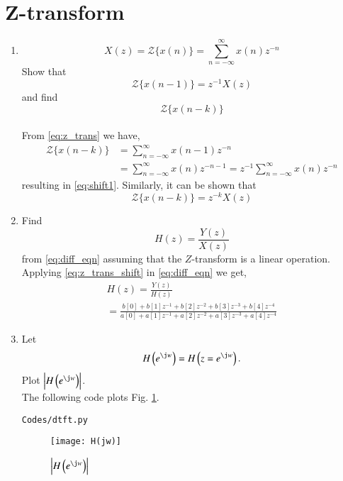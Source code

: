 \documentclass[journal,12pt,twocolumn]{IEEEtran}
\renewcommand\thesection{\arabic{section}}
\begin{document}
\section{Z-transform}
\begin{enumerate}[label=\thesection.\arabic*,ref=\thesection.\theenumi]
\item
\label{prob:Z-transform_formula}
%
\begin{equation}
\label{eq:z_trans}
X(z)={\mathcal {Z}}\{x(n)\}=\sum _{n=-\infty }^{\infty }x(n)z^{-n}
\end{equation}
%
Show that
\begin{equation}
\label{eq:shift1}
{\mathcal {Z}}\{x(n-1)\} = z^{-1}X(z)
\end{equation}
and find
\begin{equation}
    {\mathcal {Z}}\{x(n-k)\} 
\end{equation}
\\
\solution From \eqref{eq:z_trans} we have,
\begin{align}
{\mathcal {Z}}\{x(n-k)\} &=\sum _{n=-\infty }^{\infty }x(n-1)z^{-n}
\\
&=\sum _{n=-\infty }^{\infty }x(n)z^{-n-1} = z^{-1}\sum _{n=-\infty }^{\infty }x(n)z^{-n}
\end{align}
resulting in \eqref{eq:shift1}. Similarly, it can be shown that
%
\begin{equation}
\label{eq:z_trans_shift}
    {\mathcal {Z}}\{x(n-k)\} = z^{-k}X(z)
\end{equation}
\item Find
%
\begin{equation}
H(z) = \frac{Y(z)}{X(z)}
\end{equation}
%
from  \eqref{eq:diff_eqn} assuming that the $Z$-transform is a linear operation.
\\
\solution  Applying \eqref{eq:z_trans_shift} in \eqref{eq:diff_eqn} we get,
\begin{equation}
\begin{split}
H(z) = \frac{Y(z)}{H(z)}                
\\
=\frac{b[0]+b[1]z^{-1}+b[2]z^{-2}+b[3]z^{-3}+b[4]z^{-4}}{a[0]+a[1]z^{-1}+a[2]z^{-2}+a[3]z^{-3}+a[4]z^{-4}}
\label{eq:freq_resp}
\end{split}
\end{equation}
%
\item 
Let
\begin{equation}
H\brak{e^{\j w}} = H\brak{z = e^{\j w}}.
\end{equation}
Plot $\abs{H\brak{e^{\j w}}}$.
\\
\solution
The following code plots Fig. \ref{fig:H(jw)}.
\begin{lstlisting}
Codes/dtft.py
\end{lstlisting}
\begin{figure}[!ht]
\centering
\texttt{[image: H(jw)]}
\caption{$\abs{H\brak{e^{\j w}}}$}
\label{fig:H(jw)}
\end{figure}
\end{enumerate}
\end{document}

